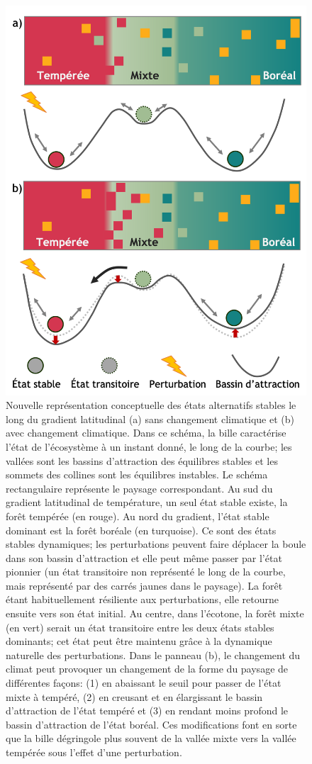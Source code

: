 \begin{figure}
\centering
\includegraphics[width=.63\textwidth]{conclusion/figures/etat_alternatif2.png}
\caption[Représentation conceptuelle des états alternatifs stables le long du gradient latitudinal]{Nouvelle représentation conceptuelle des états alternatifs stables le long du gradient latitudinal (a) sans changement climatique et (b) avec changement climatique. Dans ce schéma, la bille caractérise l'état de l'écosystème à un instant donné, le long de la courbe; les vallées sont les bassins d'attraction des équilibres stables et les sommets des collines sont les équilibres instables. Le schéma rectangulaire représente le paysage correspondant. Au sud du gradient latitudinal de température, un seul état stable existe, la forêt tempérée (en rouge). Au nord du gradient, l'état stable dominant est la forêt boréale (en turquoise). Ce sont des états stables dynamiques; les perturbations peuvent faire déplacer la boule dans son bassin d'attraction et elle peut même passer par l'état pionnier (un état transitoire non représenté le long de la courbe, mais représenté par des carrés jaunes dans le paysage). La forêt étant habituellement résiliente aux perturbations, elle retourne ensuite vers son état initial. Au centre, dans l'écotone, la forêt mixte (en vert) serait un état transitoire entre les deux états stables dominants; cet état peut être maintenu grâce à la dynamique naturelle des perturbations. Dans le panneau (b), le changement du climat peut provoquer un changement de la forme du paysage de différentes façons: (1) en abaissant le seuil pour passer de l'état mixte à tempéré, (2) en creusant et en élargissant le bassin d'attraction de l'état tempéré et (3) en rendant moins profond le bassin d'attraction de l'état boréal. Ces modifications font en sorte que la bille dégringole plus souvent de la vallée mixte vers la vallée tempérée sous l'effet d'une perturbation.}
\label{fig4.1}
\end{figure}

